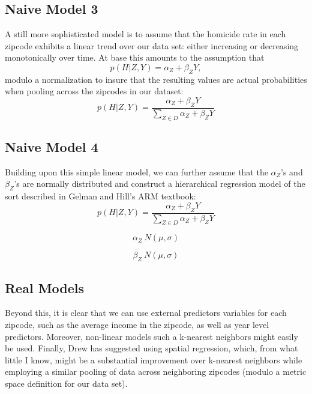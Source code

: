 \documentclass[11pt]{amsart}
\begin{document}
\subsection{Naive Model 3}
A still more sophisticated model is to assume that the homicide rate in each zipcode exhibits a linear trend over our data set: either increasing or decreasing monotonically over time. At base this amounts to the assumption that
\[
p(H | Z, Y) = \alpha_{Z} + \beta_{Z} Y,
\]
modulo a normalization to insure that the resulting values are actual probabilities when pooling across the zipcodes in our dataset:
\[
p(H | Z, Y) = \frac{\alpha_{Z} + \beta_{Z} Y}{\sum_{Z \in D} \alpha_{Z} + \beta_{Z} Y}
\]

\subsection{Naive Model 4}
Building upon this simple linear model, we can further assume that the $\alpha_Z$'s and $\beta_Z$'s are normally distributed and construct a hierarchical regression model of the sort described in Gelman and Hill's ARM textbook:
\[
p(H | Z, Y) = \frac{\alpha_{Z} + \beta_{Z} Y}{\sum_{Z \in D} \alpha_{Z} + \beta_{Z} Y}
\]

\[
\alpha_{Z} ~ N(\mu, \sigma)
\]

\[
\beta_{Z} ~ N(\mu, \sigma)
\]

\subsection{Real Models}
Beyond this, it is clear that we can use external predictors variables for each zipcode, such as the average income in the zipcode, as well as year level predictors. Moreover, non-linear models such a k-nearest neighbors might easily be used. Finally, Drew has suggested using spatial regression, which, from what little I know, might be a substantial improvement over k-nearest neighbors while employing a similar pooling of data across neighboring zipcodes (modulo a metric space definition for our data set).
\end{document}
